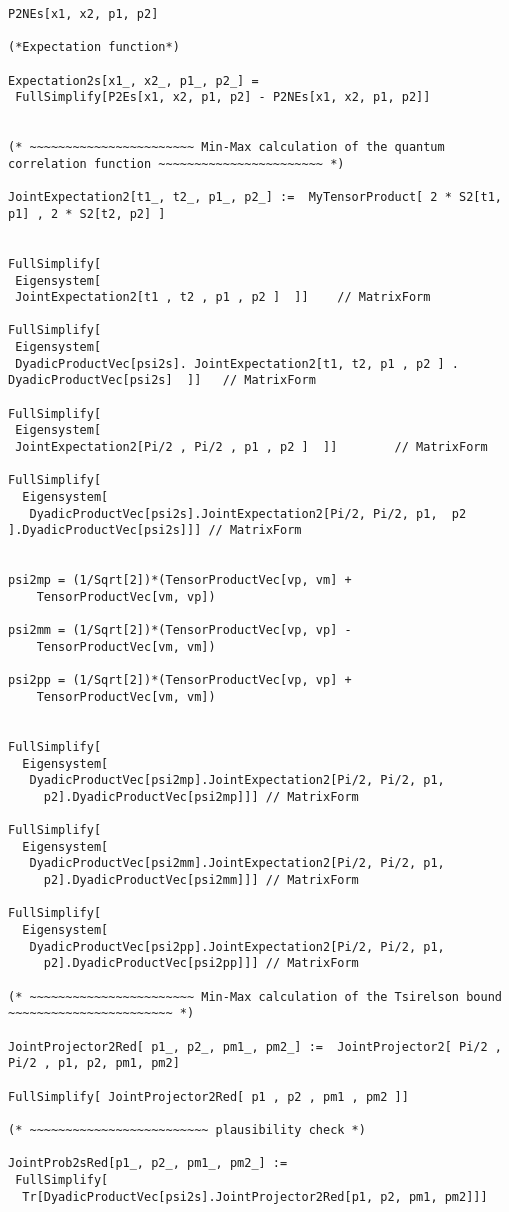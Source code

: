 \documentclass[%
 showpacs,
 showkeys,
 preprintnumbers,
 amsmath,amssymb,
 aps,
  pra,
  longbibliography,
 floatfix,
 ]{revtex4-1}
\begin{document}
{\begin{lstlisting}[backgroundcolor=\color{yellow!10},framerule=0pt,breaklines=true, frame=tb]
P2NEs[x1, x2, p1, p2]

(*Expectation function*)

Expectation2s[x1_, x2_, p1_, p2_] =
 FullSimplify[P2Es[x1, x2, p1, p2] - P2NEs[x1, x2, p1, p2]]


(* ~~~~~~~~~~~~~~~~~~~~~~~ Min-Max calculation of the quantum correlation function ~~~~~~~~~~~~~~~~~~~~~~~ *)

JointExpectation2[t1_, t2_, p1_, p2_] :=  MyTensorProduct[ 2 * S2[t1, p1] , 2 * S2[t2, p2] ]


FullSimplify[
 Eigensystem[
 JointExpectation2[t1 , t2 , p1 , p2 ]  ]]    // MatrixForm

FullSimplify[
 Eigensystem[
 DyadicProductVec[psi2s]. JointExpectation2[t1, t2, p1 , p2 ] . DyadicProductVec[psi2s]  ]]   // MatrixForm

FullSimplify[
 Eigensystem[
 JointExpectation2[Pi/2 , Pi/2 , p1 , p2 ]  ]]        // MatrixForm

FullSimplify[
  Eigensystem[
   DyadicProductVec[psi2s].JointExpectation2[Pi/2, Pi/2, p1,  p2 ].DyadicProductVec[psi2s]]] // MatrixForm


psi2mp = (1/Sqrt[2])*(TensorProductVec[vp, vm] +
    TensorProductVec[vm, vp])

psi2mm = (1/Sqrt[2])*(TensorProductVec[vp, vp] -
    TensorProductVec[vm, vm])

psi2pp = (1/Sqrt[2])*(TensorProductVec[vp, vp] +
    TensorProductVec[vm, vm])


FullSimplify[
  Eigensystem[
   DyadicProductVec[psi2mp].JointExpectation2[Pi/2, Pi/2, p1,
     p2].DyadicProductVec[psi2mp]]] // MatrixForm

FullSimplify[
  Eigensystem[
   DyadicProductVec[psi2mm].JointExpectation2[Pi/2, Pi/2, p1,
     p2].DyadicProductVec[psi2mm]]] // MatrixForm

FullSimplify[
  Eigensystem[
   DyadicProductVec[psi2pp].JointExpectation2[Pi/2, Pi/2, p1,
     p2].DyadicProductVec[psi2pp]]] // MatrixForm

(* ~~~~~~~~~~~~~~~~~~~~~~~ Min-Max calculation of the Tsirelson bound ~~~~~~~~~~~~~~~~~~~~~~~ *)

JointProjector2Red[ p1_, p2_, pm1_, pm2_] :=  JointProjector2[ Pi/2 , Pi/2 , p1, p2, pm1, pm2]

FullSimplify[ JointProjector2Red[ p1 , p2 , pm1 , pm2 ]]

(* ~~~~~~~~~~~~~~~~~~~~~~~~~ plausibility check *)

JointProb2sRed[p1_, p2_, pm1_, pm2_] :=
 FullSimplify[
  Tr[DyadicProductVec[psi2s].JointProjector2Red[p1, p2, pm1, pm2]]]


\end{lstlisting}}
\end{document}
